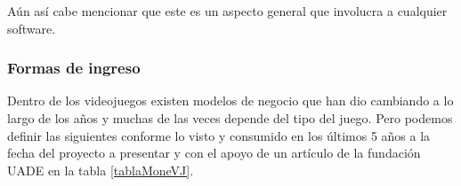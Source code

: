 \begin{table}[htbp]
	\centering
	\caption{Tabla comparativa de un producto físico o digital por Velneo \cite{velneo2015}}
	\label{fiDi}
\end{table}

Aún así cabe mencionar que este es un aspecto general que involucra a cualquier software.

\subsubsection{Formas de ingreso}
Dentro de los videojuegos existen modelos de negocio que han dio cambiando a lo largo de los años y muchas de las veces depende del tipo del juego. Pero podemos definir las siguientes conforme lo visto y consumido en los últimos 5 años a la fecha del proyecto a presentar y con el apoyo de un artículo de la fundación UADE \cite{fundacionuade2014} en la tabla \ref{tablaMoneVJ}.

